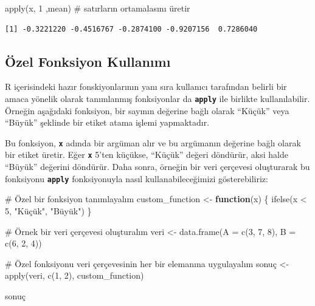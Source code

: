 \documentclass[
  letterpaper,
  DIV=11,
  numbers=noendperiod]{scrreprt}
\newenvironment{Shaded}{\begin{snugshade}}{\end{snugshade}}
\newcommand{\AttributeTok}[1]{\textcolor[rgb]{0.40,0.45,0.13}{#1}}
\newcommand{\CommentTok}[1]{\textcolor[rgb]{0.37,0.37,0.37}{#1}}
\newcommand{\ControlFlowTok}[1]{\textcolor[rgb]{0.00,0.23,0.31}{\textbf{#1}}}
\newcommand{\DecValTok}[1]{\textcolor[rgb]{0.68,0.00,0.00}{#1}}
\newcommand{\FunctionTok}[1]{\textcolor[rgb]{0.28,0.35,0.67}{#1}}
\newcommand{\NormalTok}[1]{\textcolor[rgb]{0.00,0.23,0.31}{#1}}
\newcommand{\OtherTok}[1]{\textcolor[rgb]{0.00,0.23,0.31}{#1}}
\newcommand{\SpecialCharTok}[1]{\textcolor[rgb]{0.37,0.37,0.37}{#1}}
\newcommand{\StringTok}[1]{\textcolor[rgb]{0.13,0.47,0.30}{#1}}
\begin{document}
\begin{Shaded}
\begin{Highlighting}[]
\FunctionTok{apply}\NormalTok{(x, }\DecValTok{1}\NormalTok{ ,mean) }\CommentTok{\# satırların ortamalasını üretir}
\end{Highlighting}
\end{Shaded}

\begin{verbatim}
[1] -0.3221220 -0.4516767 -0.2874100 -0.9207156  0.7286040
\end{verbatim}

\subsection{Özel Fonksiyon
Kullanımı}\label{uxf6zel-fonksiyon-kullanux131mux131}

R içerisindeki hazır fonskiyonlarının yanı sıra kullanıcı tarafından
belirli bir amaca yönelik olarak tanımlanmış fonksiyonlar da
\textbf{\texttt{apply}} ile birlikte kullanılabilir. Örneğin aşağıdaki
fonksiyon, bir sayının değerine bağlı olarak ``Küçük'' veya ``Büyük''
şeklinde bir etiket atama işlemi yapmaktadır.

Bu fonksiyon, \textbf{\texttt{x}} adında bir argüman alır ve bu
argümanın değerine bağlı olarak bir etiket üretir. Eğer
\textbf{\texttt{x}} 5'ten küçükse, ``Küçük'' değeri döndürür, aksi halde
``Büyük'' değerini döndürür. Daha sonra, örneğin bir veri çerçevesi
oluşturarak bu fonksiyonu \textbf{\texttt{apply}} fonksiyonuyla nasıl
kullanabileceğimizi gösterebiliriz:

\begin{Shaded}
\begin{Highlighting}[]
\CommentTok{\# Özel bir fonksiyon tanımlayalım}
\NormalTok{custom\_function }\OtherTok{\textless{}{-}} \ControlFlowTok{function}\NormalTok{(x) \{}
  \FunctionTok{ifelse}\NormalTok{(x }\SpecialCharTok{\textless{}} \DecValTok{5}\NormalTok{, }\StringTok{"Küçük"}\NormalTok{, }\StringTok{"Büyük"}\NormalTok{)}
\NormalTok{\}}

\CommentTok{\# Örnek bir veri çerçevesi oluşturalım}
\NormalTok{veri }\OtherTok{\textless{}{-}} \FunctionTok{data.frame}\NormalTok{(}\AttributeTok{A =} \FunctionTok{c}\NormalTok{(}\DecValTok{3}\NormalTok{, }\DecValTok{7}\NormalTok{, }\DecValTok{8}\NormalTok{), }\AttributeTok{B =} \FunctionTok{c}\NormalTok{(}\DecValTok{6}\NormalTok{, }\DecValTok{2}\NormalTok{, }\DecValTok{4}\NormalTok{))}

\CommentTok{\# Özel fonksiyonu veri çerçevesinin her bir elemanına uygulayalım}
\NormalTok{sonuç }\OtherTok{\textless{}{-}} \FunctionTok{apply}\NormalTok{(veri, }\FunctionTok{c}\NormalTok{(}\DecValTok{1}\NormalTok{, }\DecValTok{2}\NormalTok{), custom\_function)}

\NormalTok{sonuç}
\end{Highlighting}
\end{Shaded}
\end{document}
